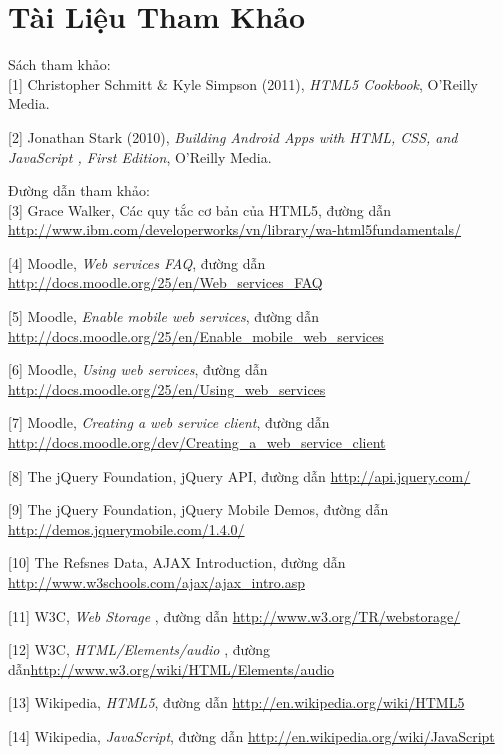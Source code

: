 \chapter{Tài Liệu Tham Khảo}

Sách tham khảo:\\

[1] Christopher Schmitt \& Kyle Simpson (2011), \textit{HTML5 Cookbook}, O'Reilly Media.

[2] Jonathan Stark (2010), \textit{Building Android Apps with HTML, CSS, and JavaScript , First Edition}, O'Reilly Media.

Đường dẫn tham khảo:\\

[3] Grace Walker, Các quy tắc cơ bản của HTML5, đường dẫn \url{http://www.ibm.com/developerworks/vn/library/wa-html5fundamentals/}

[4] Moodle, \textit{Web services FAQ}, đường dẫn \url{http://docs.moodle.org/25/en/Web_services_FAQ}

[5] Moodle, \textit{Enable mobile web services}, đường dẫn \url{http://docs.moodle.org/25/en/Enable_mobile_web_services}

[6] Moodle, \textit{Using web services}, đường dẫn \url{http://docs.moodle.org/25/en/Using_web_services}

[7] Moodle, \textit{Creating a web service client}, đường dẫn \url{http://docs.moodle.org/dev/Creating_a_web_service_client}

[8] The jQuery Foundation, jQuery API, đường dẫn \url{http://api.jquery.com/} 
  
[9] The jQuery Foundation, jQuery Mobile Demos, đường dẫn  \url{http://demos.jquerymobile.com/1.4.0/}

[10] The Refsnes Data, AJAX Introduction, đường dẫn \url{http://www.w3schools.com/ajax/ajax_intro.asp}

[11] W3C, \textit{Web Storage} , đường dẫn \url{http://www.w3.org/TR/webstorage/}

[12] W3C, \textit{HTML/Elements/audio} , đường dẫn\url{http://www.w3.org/wiki/HTML/Elements/audio}

[13] Wikipedia, \textit{HTML5}, đường dẫn \url{http://en.wikipedia.org/wiki/HTML5}

[14] Wikipedia, \textit{JavaScript}, đường dẫn \url{http://en.wikipedia.org/wiki/JavaScript}



